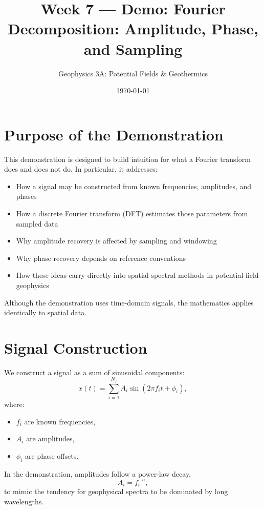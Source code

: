 \documentclass[11pt,a4paper]{article}
\title{Week 7 --- Demo: Fourier Decomposition: Amplitude, Phase, and Sampling}
\author{Geophysics 3A: Potential Fields \& Geothermics}
\date{\today}
\begin{document}
\maketitle

\section{Purpose of the Demonstration}

This demonstration is designed to build intuition for what a Fourier transform does and does not do.
In particular, it addresses:

\begin{itemize}
  \item How a signal may be constructed from known frequencies, amplitudes, and phases
  \item How a discrete Fourier transform (DFT) estimates those parameters from sampled data
  \item Why amplitude recovery is affected by sampling and windowing
  \item Why phase recovery depends on reference conventions
  \item How these ideas carry directly into spatial spectral methods in potential field geophysics
\end{itemize}

Although the demonstration uses time-domain signals, the mathematics applies identically to spatial data.

\section{Signal Construction}

We construct a signal as a sum of sinusoidal components:
\begin{equation}
x(t) = \sum_{i=1}^{N_f} A_i \sin\!\left(2\pi f_i t + \phi_i\right),
\end{equation}
where:
\begin{itemize}
  \item $f_i$ are known frequencies,
  \item $A_i$ are amplitudes,
  \item $\phi_i$ are phase offsets.
\end{itemize}

In the demonstration, amplitudes follow a power-law decay,
\begin{equation}
A_i = f_i^{-n},
\end{equation}
to mimic the tendency for geophysical spectra to be dominated by long wavelengths.
\end{document}
